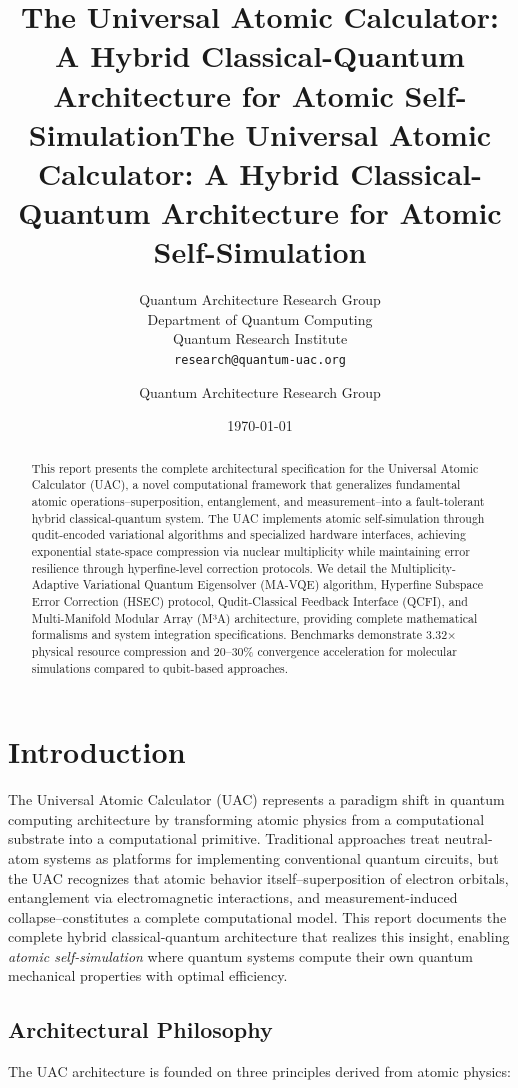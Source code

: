 \documentclass[12pt, a4paper]{article}
\title{\bfseries\Large The Universal Atomic Calculator: \\
       \vspace{0.3em}
       \large A Hybrid Classical-Quantum Architecture for Atomic Self-Simulation}
\author{Quantum Architecture Research Group \\
        \small Department of Quantum Computing \\
        \small Quantum Research Institute \\
        \small \texttt{research@quantum-uac.org}}
\date{\small \today \\ \vspace{-0.5em} \rule{\textwidth}{0.4pt}}
\title{The Universal Atomic Calculator: A Hybrid Classical-Quantum Architecture for Atomic Self-Simulation}
\author{Quantum Architecture Research Group}
\date{\today}
\begin{document}
\maketitle

\begin{abstract}
This report presents the complete architectural specification for the Universal Atomic Calculator (UAC), a novel computational framework that generalizes fundamental atomic operations--superposition, entanglement, and measurement--into a fault-tolerant hybrid classical-quantum system. The UAC implements atomic self-simulation through qudit-encoded variational algorithms and specialized hardware interfaces, achieving exponential state-space compression via nuclear multiplicity while maintaining error resilience through hyperfine-level correction protocols. We detail the Multiplicity-Adaptive Variational Quantum Eigensolver (MA-VQE) algorithm, Hyperfine Subspace Error Correction (HSEC) protocol, Qudit-Classical Feedback Interface (QCFI), and Multi-Manifold Modular Array (M³A) architecture, providing complete mathematical formalisms and system integration specifications. Benchmarks demonstrate 3.32× physical resource compression and 20--30\% convergence acceleration for molecular simulations compared to qubit-based approaches.
\end{abstract}

\tableofcontents

\section{Introduction}
\label{sec:introduction}

The Universal Atomic Calculator (UAC) represents a paradigm shift in quantum computing architecture by transforming atomic physics from a computational substrate into a computational primitive. Traditional approaches treat neutral-atom systems as platforms for implementing conventional quantum circuits, but the UAC recognizes that atomic behavior itself--superposition of electron orbitals, entanglement via electromagnetic interactions, and measurement-induced collapse--constitutes a complete computational model. This report documents the complete hybrid classical-quantum architecture that realizes this insight, enabling \emph{atomic self-simulation} where quantum systems compute their own quantum mechanical properties with optimal efficiency.

\subsection{Architectural Philosophy}
The UAC architecture is founded on three principles derived from atomic physics:
\end{document}
